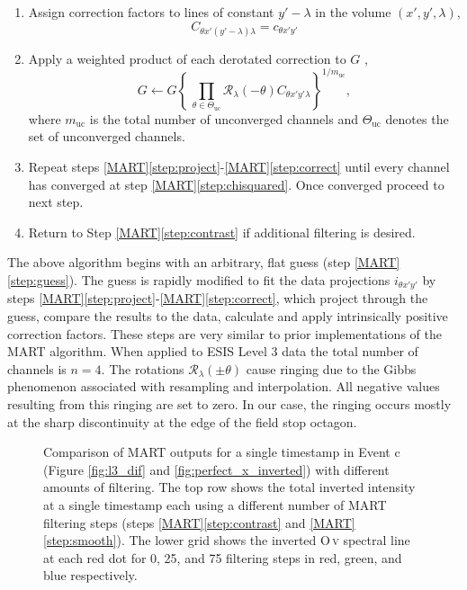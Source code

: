 \begin{enumerate}
		\item Assign correction factors to lines of constant $y'-\lambda$ in the volume $(x',y',\lambda)$,
			\begin{equation}
				C_{\theta x'(y'-\lambda)\lambda} = c_{\theta x'y'}
			\end{equation}	
		\item \label{step:correct} Apply a weighted product of each derotated correction to $G$ ,
			\begin{equation}\label{eq:correct}
				G \leftarrow G\left\lbrace  \,\prod_{\theta\in\Theta_{\mathrm{uc}}}  \mathcal{R}_\lambda(-\theta)C_{\theta x'y'\lambda} \right\rbrace^{1/m_{\mathrm{uc}}},
			\end{equation}
		where $m_{\mathrm{uc}}$ is the total number of unconverged channels and $\Theta_{\mathrm{uc}}$ denotes the set of unconverged channels.
		
		\item Repeat steps \ref{MART}\ref{step:project}-\ref{MART}\ref{step:correct}
		until every channel has converged at step \ref{MART}\ref{step:chisquared}. Once converged proceed to next step.
		\item Return to Step \ref{MART}\ref{step:contrast} if additional filtering is desired.
	\end{enumerate}
    The above algorithm begins with an arbitrary, flat guess (step \ref{MART}\ref{step:guess}). The guess is rapidly modified to fit the data projections $i_{\theta x' y'}$ by steps \ref{MART}\ref{step:project}-\ref{MART}\ref{step:correct}, which project through the guess, compare the results to the data, calculate and apply intrinsically positive correction factors. These steps are very similar to prior implementations of the MART algorithm.
	When applied to  ESIS Level 3 data the total number of channels is $n = 4$. 
	The rotations $\mathcal{R}_{\lambda}(\pm{\theta})$ cause ringing due to the Gibbs phenomenon associated with resampling and interpolation. 
	All negative values resulting from this ringing are set to zero.
	In our case, the ringing occurs mostly at the sharp discontinuity at the edge of the field stop octagon. 
	
	\begin{figure}[htb!]
		\centering
		\caption{Comparison of MART outputs for a single timestamp in Event c (Figure \ref{fig:l3_dif} and \ref{fig:perfect_x_inverted}) with different amounts of filtering. 
		The top row shows the total inverted intensity at a single timestamp each using a different number of MART filtering steps (steps \ref{MART}\ref{step:contrast} and \ref{MART}\ref{step:smooth}).  
		The lower grid shows the inverted O\,\textsc{v} spectral line at each red dot for 0, 25, and 75 filtering steps in red, green, and blue respectively.}
		\label{fig:perfect_x_invertcomp}
	\end{figure}
	
